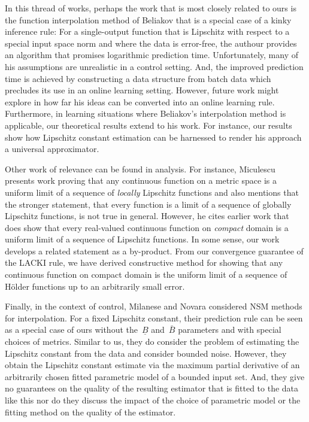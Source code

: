 \documentclass{article} %
\theoremstyle{definition}
\theoremstyle{remark}
\newcommand{\ubf}{\, {\bar B}} %
\newcommand{\lbf}{\, {\underline{B}}} %
\begin{document}
In this thread of works, perhaps the work that is most closely related to ours is the function interpolation method of Beliakov \cite{Beliakov2006} that is a special case of a kinky inference rule: For a single-output function that is Lipschitz with respect to a special input space norm and where the data is error-free, the authour provides an algorithm that promises logarithmic prediction time. Unfortunately, many of his assumptions are unrealistic in a control setting. And, the improved prediction time is achieved by constructing a data structure from batch data which precludes its use in an online learning setting. However, future work might explore in how far his ideas can be 
converted into an online learning rule. Furthermore, in learning situations where Beliakov's interpolation method is applicable, our theoretical results extend to his work. For instance, our results show how Lipschitz constant estimation can be harnessed to render his approach a universal approximator.

Other work of relevance can be found in analysis. For instance, Miculescu \cite{Miculescu2000} presents work proving that any continuous function on a metric space is a uniform limit of a sequence of \emph{locally} Lipschitz functions and also mentions that the stronger statement, that every function is a limit of a sequence of globally Lipschitz functions, is not true in general. However, he cites earlier work \cite{Georganopoulos1967} that does show that every real-valued continuous function on \emph{compact} domain is a uniform limit of a sequence of Lipschitz functions. In some sense, our work develops a related statement as a by-product. 
From our convergence guarantee of the LACKI rule, we have derived constructive method for showing 
that any continuous function on compact domain is the uniform limit of a sequence of H\"older functions up to an arbitrarily small error.

Finally, in the context of control, Milanese and Novara \cite{Milanese2004} considered NSM methods for interpolation. For a fixed Lipschitz constant, their prediction rule can be
seen as a special case of ours without the $\lbf$ and $\ubf$ parameters and with special choices of metrics. Similar to us, they do consider the problem of estimating the Lipschitz constant from the data and consider bounded noise. However, they obtain the Lipschitz constant estimate via the maximum partial derivative of an arbitrarily chosen fitted parametric model of a bounded input set. And, they give no guarantees on the quality of the resulting estimator that is fitted to the data like this nor do they discuss the impact of the choice of parametric model or the fitting method on the quality of the estimator.
 
\end{document}
